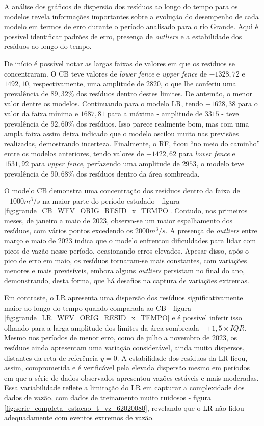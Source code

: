 A análise dos gráficos de dispersão dos resíduos ao longo do tempo para os modelos revela informações importantes sobre a evolução do desempenho de cada modelo em termos de erro durante o período analisado para o rio Grande. Aqui é possível identificar padrões de erro, presença de \textit{outliers} e a estabilidade dos resíduos ao longo do tempo.

De início é possível notar as largas faixas de valores em que os resíduos se concentraram. O CB teve valores de \textit{lower fence} e \textit{upper fence} de $-1328,72$ e $1492,10$, respectivamente, uma amplitude de $2820$, o que lhe conferiu uma prevalência de $89,32\%$ dos resíduos dentro destes limites. De antemão, o menor valor dentre os modelos. Continuando para o modelo LR, tendo $-1628,38$ para o valor da faixa mínima e $1687,81$ para a máxima - amplitude de $3315$ - teve prevalência de $92,60\%$ dos resíduos. Isso parece realmente bom, mas com uma ampla faixa assim deixa indicado que o modelo oscilou muito nas previsões realizadas, demostrando incerteza. Finalmente, o RF, ficou ``no meio do caminho'' entre os modelos anteriores, tendo valores de $-1422,62$ para \textit{lower fence} e $1531,92$ para \textit{upper fence}, perfazendo uma amplitude de $2953$, o modelo teve prevalência de $90,68\%$ dos resíduos dentro da área sombreada.

O modelo CB demonstra uma concentração dos resíduos dentro da faixa de $\pm 1000 m^3/s$ na maior parte do período estudado - figura \ref{fig:grande_CB_WFV_ORIG_RESID_x_TEMPO}. Contudo, nos primeiros meses, de janeiro a maio de $2023$, observa-se um maior espalhamento dos resíduos, com vários pontos excedendo os $2000 m^3/s$. A presença de \textit{outliers} entre março e maio de $2023$ indica que o modelo enfrentou dificuldades para lidar com picos de vazão nesse período, ocasionando erros elevados. Apesar disso, após o pico de erro em maio, os resíduos tornaram-se mais constantes, com variações menores e mais previsíveis, embora alguns \textit{outliers} persistam no final do ano, demonstrando, desta forma, que há desafios na captura de variações extremas.

Em contraste, o LR apresenta uma dispersão dos resíduos significativamente maior ao longo do tempo quando comparada ao CB - figura \ref{fig:grande_LR_WFV_ORIG_RESID_x_TEMPO} e é possível inferir isso olhando para a larga amplitude dos limites da área sombreada - $\pm 1,5 \times IQR$. Mesmo nos períodos de menor erro, como de julho a novembro de $2023$, os resíduos ainda apresentam uma variação considerável, ainda muito dispersos, distantes da reta de referência $y=0$. A estabilidade dos resíduos da LR ficou, assim, comprometida e é verificável pela elevada dispersão mesmo em períodos em que a série de dados observados apresentou vazões estáveis e mais moderadas. Essa variabilidade reflete a limitação do LR em capturar a complexidade dos dados de vazão, com dados de treinamento muito ruidosos - figura \ref{fig:serie_completa_estacao_t_vz_62020080}, revelando que o LR não lidou adequadamente com eventos extremos de vazão.

